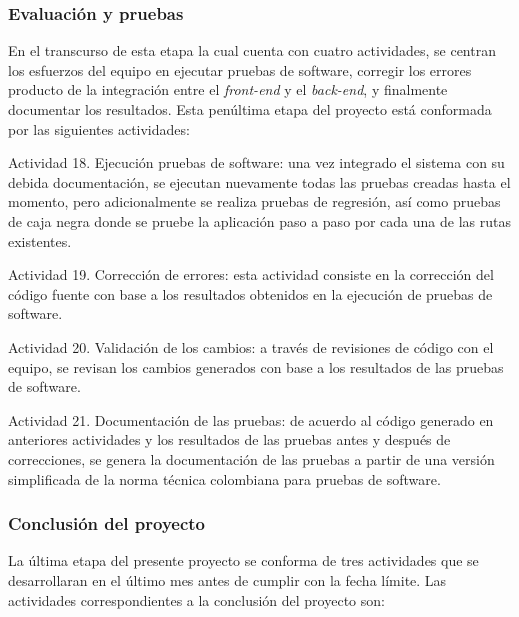 \subsubsection{Evaluación y pruebas}
En el transcurso de esta etapa la cual cuenta con cuatro actividades, se centran los esfuerzos del equipo en ejecutar pruebas de software, corregir los errores producto de la integración entre el \textit{front-end} y el \textit{back-end}, y finalmente documentar los resultados. Esta penúltima etapa del proyecto está conformada por las siguientes actividades:

\begin{APAitemize}
    \item Actividad 18. Ejecución pruebas de software: una vez integrado el sistema con su debida documentación, se ejecutan nuevamente todas las pruebas creadas hasta el momento, pero adicionalmente se realiza pruebas de regresión, así como pruebas de caja negra donde se pruebe la aplicación paso a paso por cada una de las rutas existentes.
    \item Actividad 19. Corrección de errores: esta actividad consiste en la corrección del código fuente con base a los resultados obtenidos en la ejecución de pruebas de software.
    \item Actividad 20. Validación de los cambios: a través de revisiones de código con el equipo, se revisan los cambios generados con base a los resultados de las pruebas de software. 
    \item Actividad 21. Documentación de las pruebas: de acuerdo al código generado en anteriores actividades y los resultados de las pruebas antes y después de correcciones, se genera la documentación de las pruebas a partir de una versión simplificada de la norma técnica colombiana para pruebas de software.
\end{APAitemize}

\subsubsection{Conclusión del proyecto}
La última etapa del presente proyecto se conforma de tres actividades que se desarrollaran en el último mes antes de cumplir con la fecha límite. Las actividades correspondientes a la conclusión del proyecto son:

